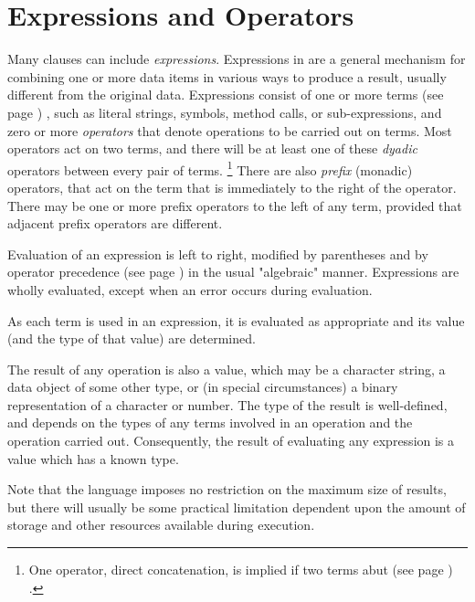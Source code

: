\chapter{Expressions and Operators}\label{refexpr}
Many clauses can include \emph{expressions}.  Expressions in \nr{}
are a general mechanism for combining one or more data items in various
ways to produce a result, usually different from the original data.
Expressions consist of one or more  terms (see page \pageref{refterms}) , such as
literal strings, symbols, method calls, or sub-expressions,
and zero or more \emph{operators} that denote operations to be carried
out on terms.
Most operators act on two terms, and there will be at least one of these
\emph{dyadic} operators between every pair of terms.
\footnote{
One operator, direct concatenation, is implied if two terms
 abut (see page \pageref{refabut}) .
}
There are also \emph{prefix} (monadic) operators, that act on the
term that is immediately to the right of the operator.
There may be one or more prefix operators to the left of any term,
provided that adjacent prefix operators are different.

Evaluation of an expression is left to right, modified by parentheses
and by  operator precedence (see page \pageref{refpreced})  in the usual
"algebraic" manner.
Expressions are wholly evaluated, except when an error occurs during
evaluation.

As each term is used in an expression, it is evaluated as
appropriate and its value (and the type of that value) are determined.
 
The result of any operation is also a value, which may be a character
string, a data object of some other type, or (in special circumstances)
a binary representation of a character or number.  The type of the
result is well-defined, and depends on the types of any terms involved
in an operation and the operation carried out.
Consequently, the result of evaluating any expression is a value which
has a known type.
 
Note that the \nr{} language imposes no restriction on the maximum
size of results, but there will usually be some practical limitation
dependent upon the amount of storage and other resources available
during execution.
